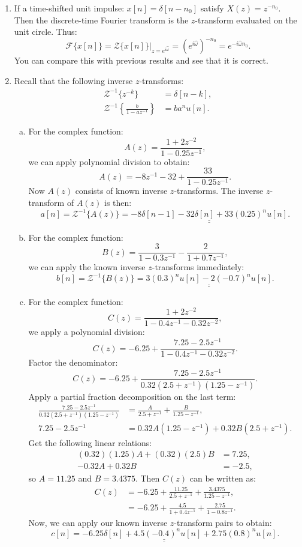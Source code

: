 \begin{enumerate}
\begin{enumerate}[a)]
\end{enumerate}

\item If a time-shifted unit impulse: $x[n]=\delta[n-n_0]$ satisfy $X(z)=z^{-n_{0}}$. Then the discrete-time Fourier transform is the $z$-transform evaluated on the unit circle. Thus:
$$\mathcal{F}\{x[n]\}=\mathcal{Z}\{x[n]\}|_{z=e^{i\hat{\omega}}}=(e^{i\hat{\omega}})^{-n_{0}}=e^{-i\hat{\omega}n_{0}}.$$
You can compare this with previous results and see that it is correct. 

\item Recall that the following inverse $z$-transforms:
\begin{align*}
    \mathcal{Z}^{-1}\{z^{-k}\}&= \delta[n-k], \\
    \mathcal{Z}^{-1}\left\{\frac{b}{1-az^{-1}}\right\}&=ba^{n}u[n].
\end{align*}
\begin{enumerate}[a)]
\item For the complex function:
$$A(z)=\frac{1+2z^{-2}}{1-0.25z^{-1}},$$
we can apply polynomial division to obtain:
$$A(z)=-8z^{-1}-32+\frac{33}{1-0.25z^{-1}}.$$
Now $A(z)$ consists of known inverse $z$-transforms. The inverse $z$-transform of $A(z)$ is then:
$$a[n]=\mathcal{Z}^{-1}\{A(z)\}=\underline{\underline{-8\delta[n-1]-32\delta[n]+33(0.25)^{n}u[n]}}.$$

\item For the complex function:
$$B(z)=\frac{3}{1-0.3z^{-1}}-\frac{2}{1+0.7z^{-1}},$$
we can apply the known inverse $z$-transforms immediately:
$$b[n]=\mathcal{Z}^{-1}\{B(z)\}=\underline{\underline{3(0.3)^{n}u[n]-2(-0.7)^{n}u[n]}}.$$

\item For the complex function: 
$$C(z)=\frac{1+2z^{-2}}{1-0.4z^{-1}-0.32z^{-2}},$$
we apply a polynomial division:
$$C(z)=-6.25+\frac{7.25-2.5z^{-1}}{1-0.4z^{-1}-0.32z^{-2}}.$$
Factor the denominator:
$$C(z)=-6.25+\frac{7.25-2.5z^{-1}}{0.32(2.5+z^{-1})(1.25-z^{-1})}.$$
Apply a partial fraction decomposition on the last term:
\begin{align*}
    \frac{7.25-2.5z^{-1}}{0.32(2.5+z^{-1})(1.25-z^{-1})}&=\frac{A}{2.5+z^{-1}}+\frac{B}{1.25-z^{-1}}, \\
    7.25-2.5z^{-1}&=0.32A(1.25-z^{-1}) + 0.32B(2.5+z^{-1}).
\end{align*}
Get the following linear relations:
\begin{align*}
    (0.32)(1.25)A + (0.32)(2.5)B &= 7.25, \\
    -0.32A + 0.32B &= -2.5,
\end{align*}
so $A=11.25$ and $B=3.4375$. Then $C(z)$ can be written as:
\begin{align*}
    C(z)&=-6.25+\frac{11.25}{2.5+z^{-1}}+\frac{3.4375}{1.25-z^{-1}}, \\
    &=-6.25 + \frac{4.5}{1+0.4z^{-1}} + \frac{2.75}{1-0.8z^{-1}}.
\end{align*}
Now, we can apply our known inverse $z$-transform pairs to obtain:
$$\underline{\underline{c[n]=-6.25\delta[n]+4.5(-0.4)^{n}u[n]+2.75(0.8)^{n}u[n]}}.$$
\end{enumerate}


\end{enumerate}
